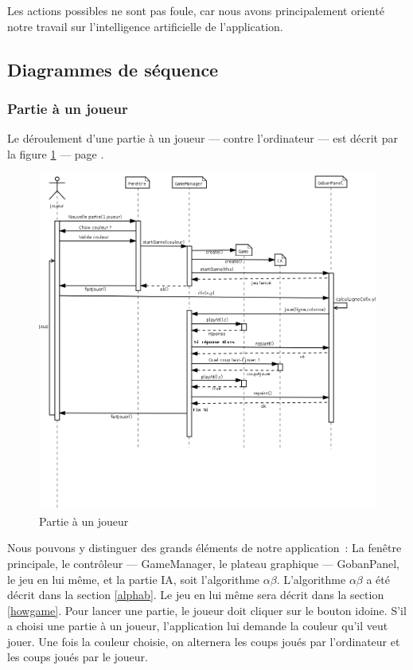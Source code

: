 \documentclass[11pt,a4paper,titlepage,french]{article}
\begin{document}
		Les actions possibles ne sont pas foule, car nous avons principalement orienté notre travail sur l'intelligence artificielle de l'application.

		\subsection{Diagrammes de séquence}

			\subsubsection{Partie à un joueur}
				Le déroulement d'une partie à un joueur --- contre l'ordinateur --- est décrit par la figure \ref{oneplayer} --- page \pageref{oneplayer}.

				\begin{figure}[ohbt]
					\begin{center}
						\includegraphics[width=1.1\textwidth]{./IA_1J.png}
					\end{center}
					\caption{Partie à un joueur}
					\label{oneplayer}
				\end{figure}


				Nous pouvons y distinguer des grands éléments de notre application~: La fenêtre principale, le contrôleur --- GameManager, le plateau graphique --- GobanPanel, le jeu en lui même, et la partie IA, soit l'algorithme $\alpha\beta$. L'algorithme $\alpha\beta$ a été décrit dans la section \ref{alphab}. Le jeu en lui même sera décrit dans la section \ref{howgame}. Pour lancer une partie, le joueur doit cliquer sur le bouton idoine. S'il a choisi une partie à un joueur, l'application lui demande la couleur qu'il veut jouer. Une fois la couleur choisie, on alternera les coups joués par l'ordinateur et les coups joués par le joueur.
\end{document}
